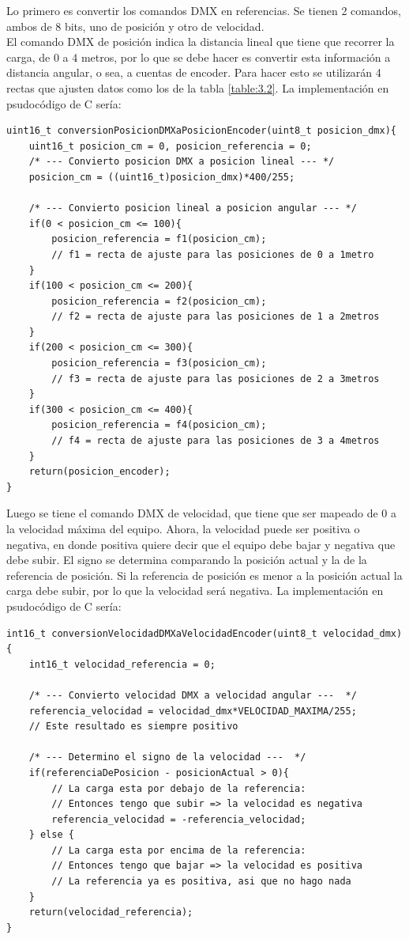 Lo primero es convertir los comandos DMX en referencias. Se tienen 2 comandos, ambos de 8 bits, uno de posición y otro de velocidad.\\
El comando DMX de posición indica la distancia lineal que tiene que recorrer la carga, de 0 a 4 metros, por lo que se debe hacer es convertir esta información a distancia angular, o sea, a cuentas de encoder. Para hacer esto se utilizarán 4 rectas que ajusten datos como los de la tabla \ref{table:3.2}. La implementación en psudocódigo de C sería:
\begin{lstlisting}[style=CStyle]
uint16_t conversionPosicionDMXaPosicionEncoder(uint8_t posicion_dmx){
	uint16_t posicion_cm = 0, posicion_referencia = 0;
	/* --- Convierto posicion DMX a posicion lineal --- */
	posicion_cm = ((uint16_t)posicion_dmx)*400/255;
	
	/* --- Convierto posicion lineal a posicion angular --- */
	if(0 < posicion_cm <= 100){
		posicion_referencia = f1(posicion_cm); 
		// f1 = recta de ajuste para las posiciones de 0 a 1metro
	}
	if(100 < posicion_cm <= 200){
		posicion_referencia = f2(posicion_cm); 
		// f2 = recta de ajuste para las posiciones de 1 a 2metros
	}
	if(200 < posicion_cm <= 300){
		posicion_referencia = f3(posicion_cm); 
		// f3 = recta de ajuste para las posiciones de 2 a 3metros
	}
	if(300 < posicion_cm <= 400){
		posicion_referencia = f4(posicion_cm); 
		// f4 = recta de ajuste para las posiciones de 3 a 4metros
	}
	return(posicion_encoder);
}
\end{lstlisting}

Luego se tiene el comando DMX de velocidad, que tiene que ser mapeado de 0 a la velocidad máxima del equipo. Ahora, la velocidad puede ser positiva o negativa, en donde positiva quiere decir que el equipo debe bajar y negativa que debe subir. El signo se determina comparando la posición actual y la de la referencia de posición. Si la referencia de posición es menor a la posición actual la carga debe subir, por lo que la velocidad será negativa. La implementación en psudocódigo de C sería:
\begin{lstlisting}[style=CStyle]
int16_t conversionVelocidadDMXaVelocidadEncoder(uint8_t velocidad_dmx){
	int16_t velocidad_referencia = 0;
	
	/* --- Convierto velocidad DMX a velocidad angular ---  */
	referencia_velocidad = velocidad_dmx*VELOCIDAD_MAXIMA/255;
	// Este resultado es siempre positivo
	
	/* --- Determino el signo de la velocidad ---  */
	if(referenciaDePosicion - posicionActual > 0){
		// La carga esta por debajo de la referencia:
		// Entonces tengo que subir => la velocidad es negativa
		referencia_velocidad = -referencia_velocidad;
	} else {
		// La carga esta por encima de la referencia:
		// Entonces tengo que bajar => la velocidad es positiva
		// La referencia ya es positiva, asi que no hago nada 
	}
	return(velocidad_referencia);
}
\end{lstlisting}

